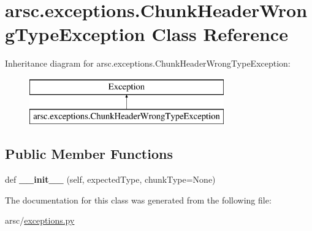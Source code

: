 \hypertarget{classarsc_1_1exceptions_1_1ChunkHeaderWrongTypeException}{}\section{arsc.\+exceptions.\+Chunk\+Header\+Wrong\+Type\+Exception Class Reference}
\label{classarsc_1_1exceptions_1_1ChunkHeaderWrongTypeException}
Inheritance diagram for arsc.\+exceptions.\+Chunk\+Header\+Wrong\+Type\+Exception\+:\begin{figure}[H]
\begin{center}
\leavevmode
\includegraphics[height=2.000000cm]{classarsc_1_1exceptions_1_1ChunkHeaderWrongTypeException}
\end{center}
\end{figure}
\subsection*{Public Member Functions}
\begin{DoxyCompactItemize}
\item 
\mbox{\label{classarsc_1_1exceptions_1_1ChunkHeaderWrongTypeException_abbca025f53d4b228b2ecfe240eebcceb}} 
def {\bfseries \+\_\+\+\_\+init\+\_\+\+\_\+} (self, expected\+Type, chunk\+Type=None)
\end{DoxyCompactItemize}


The documentation for this class was generated from the following file\+:\begin{DoxyCompactItemize}
\item 
arsc/\mbox{\hyperlink{exceptions_8py}{exceptions.\+py}}\end{DoxyCompactItemize}
